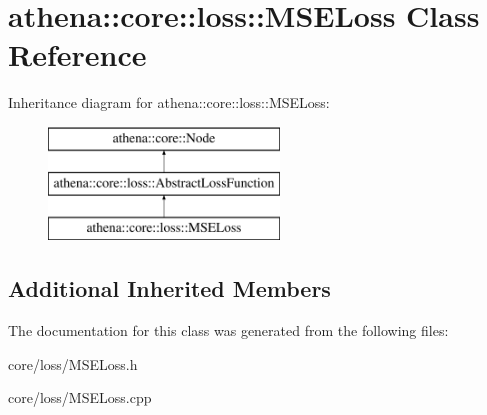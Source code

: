 \hypertarget{classathena_1_1core_1_1loss_1_1_m_s_e_loss}{}\section{athena\+:\+:core\+:\+:loss\+:\+:M\+S\+E\+Loss Class Reference}
\label{classathena_1_1core_1_1loss_1_1_m_s_e_loss}
Inheritance diagram for athena\+:\+:core\+:\+:loss\+:\+:M\+S\+E\+Loss\+:\begin{figure}[H]
\begin{center}
\leavevmode
\includegraphics[height=3.000000cm]{classathena_1_1core_1_1loss_1_1_m_s_e_loss}
\end{center}
\end{figure}
\subsection*{Additional Inherited Members}


The documentation for this class was generated from the following files\+:\begin{DoxyCompactItemize}
\item 
core/loss/M\+S\+E\+Loss.\+h\item 
core/loss/M\+S\+E\+Loss.\+cpp\end{DoxyCompactItemize}
